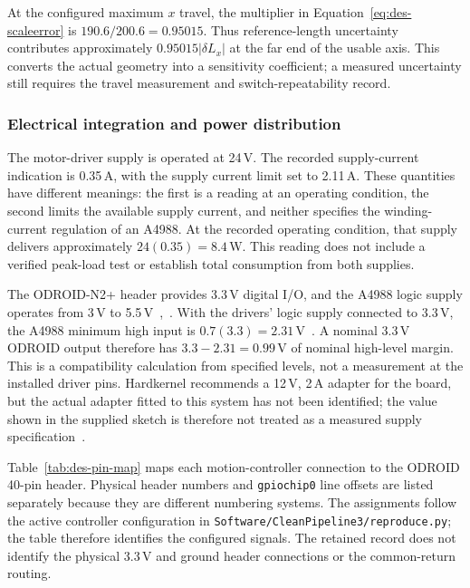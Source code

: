 At the configured maximum $x$ travel, the multiplier in Equation~\ref{eq:des-scaleerror} is $190.6/200.6=0.95015$. Thus reference-length uncertainty contributes approximately $0.95015|\delta L_x|$ at the far end of the usable axis. This converts the actual geometry into a sensitivity coefficient; a measured uncertainty still requires the travel measurement and switch-repeatability record.

\subsubsection{Electrical integration and power distribution}
\label{sec:des-power}
The motor-driver supply is operated at 24\,V. The recorded supply-current indication is 0.35\,A, with the supply current limit set to 2.11\,A. These quantities have different meanings: the first is a reading at an operating condition, the second limits the available supply current, and neither specifies the winding-current regulation of an A4988. At the recorded operating condition, that supply delivers approximately $24(0.35)=8.4$\,W. This reading does not include a verified peak-load test or establish total consumption from both supplies.

The ODROID-N2+ header provides 3.3\,V digital I/O, and the A4988 logic supply operates from 3\,V to 5.5\,V~\cite{odroidn2ds},~\cite[p.~5]{a4988ds}. With the drivers' logic supply connected to 3.3\,V, the A4988 minimum high input is $0.7(3.3)=2.31$\,V~\cite[p.~4]{a4988ds}. A nominal 3.3\,V ODROID output therefore has $3.3-2.31=0.99$\,V of nominal high-level margin. This is a compatibility calculation from specified levels, not a measurement at the installed driver pins. Hardkernel recommends a 12\,V, 2\,A adapter for the board, but the actual adapter fitted to this system has not been identified; the value shown in the supplied sketch is therefore not treated as a measured supply specification~\cite{odroidn2ds}.

Table~\ref{tab:des-pin-map} maps each motion-controller connection to the ODROID 40-pin header. Physical header numbers and \texttt{gpiochip0} line offsets are listed separately because they are different numbering systems. The assignments follow the active controller configuration in \texttt{Software/CleanPipeline3/reproduce.py}; the table therefore identifies the configured signals. The retained record does not identify the physical 3.3\,V and ground header connections or the common-return routing.



